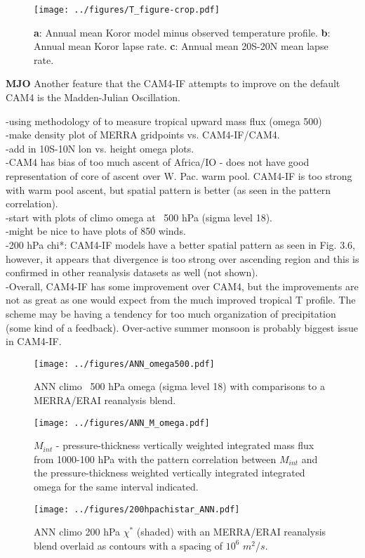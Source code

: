 \documentclass[letterpaper,12pt,titlepage,oneside,final]{book}
\begin{document}
\begin{figure}[H]
\centering
\noindent\texttt{[image: ../figures/T\_figure-crop.pdf]}\hfill
\caption{\textbf{a}: Annual mean Koror model minus observed temperature profile. \textbf{b}: Annual mean Koror lapse rate. \textbf{c}: Annual mean 20S-20N mean lapse rate.}
\end{figure}


\textbf{MJO}
Another feature that the CAM4-IF attempts to improve on the default CAM4 is the Madden-Julian Oscillation. 

-using methodology of \cite{vecchi_global_2007} to measure tropical upward mass flux (omega 500)
\\
-make density plot of MERRA gridpoints vs. CAM4-IF/CAM4. 
\\
-add in 10S-10N lon vs. height omega plots.
\\
-CAM4 has bias of too much ascent of Africa/IO - does not have good representation of core of ascent over W. Pac. warm pool. CAM4-IF is too strong with warm pool ascent, but spatial pattern is better (as seen in the pattern correlation).
\\
-start with plots of climo omega at ~500 hPa (sigma level 18).
\\
-might be nice to have plots of 850 winds.
\\
-200 hPa chi*: CAM4-IF models have a better spatial pattern as seen in Fig. 3.6, however, it appears that divergence is too strong over ascending region and this is confirmed in other reanalysis datasets as well (not shown).
\\
-Overall, CAM4-IF has some improvement over CAM4, but the improvements are not as great as one would expect from the much improved tropical T profile. The scheme may be having a tendency for too much organization of precipitation (some kind of a feedback). Over-active summer monsoon is probably biggest issue in CAM4-IF.
\\
\begin{figure}[H]
\centering
\noindent\texttt{[image: ../figures/ANN\_omega500.pdf]}\hfill
\caption{ANN climo ~500 hPa omega (sigma level 18) with comparisons to a MERRA/ERAI reanalysis blend.}
\end{figure}
\begin{figure}[H]
\centering
\noindent\texttt{[image: ../figures/ANN\_M\_omega.pdf]}\hfill
\caption{$M_{int}$ - pressure-thickness vertically weighted integrated mass flux from 1000-100 hPa with the pattern correlation between $M_{int}$ and the pressure-thickness weighted vertically integrated integrated omega for the same interval indicated.}
\end{figure}
\newpage
\begin{figure}[H]
\centering
\noindent\texttt{[image: ../figures/200hpachistar\_ANN.pdf]}\hfill
\caption{ANN climo 200 hPa $\chi^{*}$ (shaded) with an MERRA/ERAI reanalysis blend overlaid as contours with a spacing of $10^{6}$ $m^{2}$/$s$.}
\end{figure}
\end{document}
